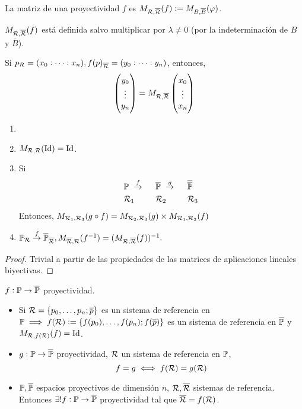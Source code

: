 \begin{defi}
    La matriz de una proyectividad $f$ es $M_{\mathcal{R}, \overline{\mathcal{R}}} (f) := M_{B, \overline{B}}(\varphi)$.
\end{defi}
\begin{obs}
    $M_{\mathcal{R}, \overline{\mathcal{R}}} (f)$ está definida salvo multiplicar por $\lambda \neq 0$ (por la indeterminación de $B$ y $\overline{B}$).
\end{obs}
\begin{obs}
    Si $p_{\mathcal{R}} = (x_0 : \dots : x_n), f(p)_{\overline{\mathcal{R}}} = (y_0 : \dots : y_n)$, entonces,
    \[
    \begin{pmatrix} y_0 \\ \vdots \\ y_n \end{pmatrix} = M_{\mathcal{R}, \overline{\mathcal{R}}} \begin{pmatrix} x_0 \\ \vdots \\ x_n \end{pmatrix}
    \]
\end{obs}
\begin{prop}[Propiedades]
    \begin{enumerate}
        \item[]
        \item $M_{\mathcal{R}, \mathcal{R}}(\operatorname{Id}) = \operatorname{Id}$.
        \item Si
            \begin{alignat*}{3}
                &\mathbb{P} \text{ } \stackrel{f}{\to} \text{  } &&\overline{\mathbb{P}} \text{ } \stackrel{g}{\to} \text{  } &&\overline{\overline{\mathbb{P}}} \\
                &\mathcal{R}_1 &&\mathcal{R}_2 &&\mathcal{R}_3
            \end{alignat*}
            Entonces, $M_{\mathcal{R}_1, \mathcal{R}_3}(g \circ f) = M_{\mathcal{R}_2, \mathcal{R}_3}(g) \times M_{\mathcal{R}_1, \mathcal{R}_2}(f)$
        \item $\mathbb{P}_{\mathcal{R}} \stackrel{f}{\to} \overline{\mathbb{P}}_{\overline{\mathcal{R}}}, M_{\overline{\mathcal{R}}, \mathcal{R}}(f^{-1}) = (M_{\mathcal{R}, \overline{\mathcal{R}}} (f))^{-1}.$
    \end{enumerate}
\end{prop}
\begin{proof}
    Trivial a partir de las propiedades de las matrices de aplicaciones lineales biyectivas.
\end{proof}
\begin{prop}
    $f : \mathbb{P} \to \overline{\mathbb{P}}$ proyectividad.
    \begin{itemize}
        \item Si $\mathcal{R} = \{p_0, \dots, p_n; \overline{p}\}$ es un sistema de referencia en $\mathbb{P} \implies f(\mathcal{R}) := \{f(p_0), \dots, f(p_n); f(\overline{p})\}$ es un sistema de referencia en $\overline{\mathbb{P}}$ y $M_{\mathcal{R}, f(\mathcal{R})}(f) = \operatorname{Id}$.
        \item $g : \mathbb{P} \to \overline{\mathbb{P}}$ proyectividad, $\mathcal{R}$ un sistema de referencia en $\mathbb{P}$,
            \[
                f = g \iff f(\mathcal{R}) = g(\mathcal{R})
            \]
        \item $\mathbb{P}, \overline{\mathbb{P}}$ espacios proyectivos de dimensión $n$, $\mathcal{R}, \overline{\mathcal{R}}$ sistemas de referencia. Entonces $\exists! f : \mathbb{P} \to \overline{\mathbb{P}}$ proyectividad tal que $\overline{\mathcal{R}} = f(\mathcal{R})$.
    \end{itemize}
\end{prop}
